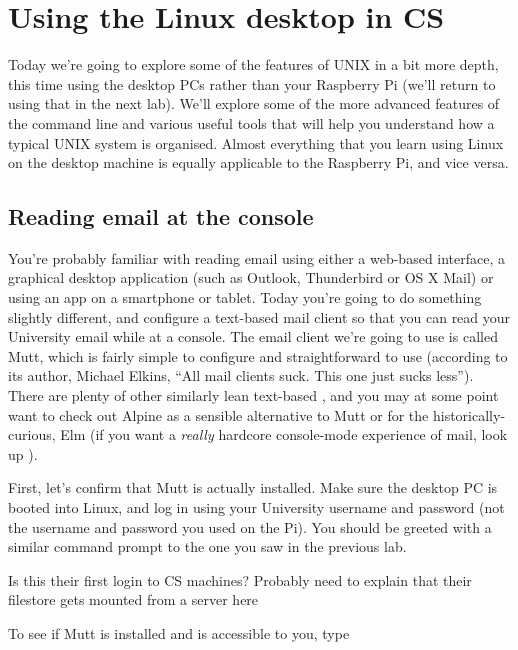 \chapter{Using the Linux desktop in CS}

Today we're going to explore some of the features of UNIX in a bit more depth, this time using the desktop PCs rather than your Raspberry Pi (we'll return to using that in the next lab). We'll explore some of the more advanced features of the command line and various useful tools that will help you understand how a typical UNIX system is organised. Almost everything that you learn using Linux on the desktop machine is equally applicable to the Raspberry Pi, and vice versa. 

\section{Reading email at the console}

You're probably familiar with reading email using either a web-based interface, a graphical desktop application (such as Outlook, Thunderbird or OS X Mail) or using an app on a smartphone or tablet. Today you're going to do something slightly different, and configure a text-based mail client so that you can read your University email while at a console. The email client we're going to use is called Mutt, which is fairly simple to configure and straightforward to use (according to its author, Michael Elkins, ``All mail clients suck. This one just sucks less''). There are plenty of other similarly lean text-based , and you may at some point want to check out Alpine as a sensible alternative to Mutt or for the historically-curious, Elm (if you want a \textit{really} hardcore console-mode experience of mail, look up ).

First, let's confirm that Mutt is actually installed. Make sure the desktop PC is booted into Linux, and log in using your University username and password (not the username and password you used on the Pi). You should be greeted with a similar command prompt to the one you saw in the previous lab.

\begin{note}
Is this their first login to CS machines? Probably need to explain that their filestore gets mounted from a server here
\end{note}

To see if Mutt is installed and is accessible to you, type

